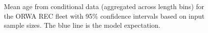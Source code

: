 \documentclass[
]{scrartcl}
\begin{document}
\begin{figure}


\caption{\label{fig-mean-age-6}Mean age from conditional data
(aggregated across length bins) for the ORWA REC fleet with 95\%
confidence intervals based on input sample sizes. The blue line is the
model expectation.}

\end{figure}%
\end{document}
